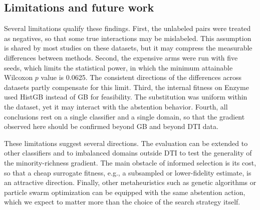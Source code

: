 \documentclass[pdflatex,sn-basic]{sn-jnl}
\begin{document}
\subsection{Limitations and future work}
Several limitations qualify these findings. First, the unlabeled pairs
were treated as negatives, so that some true interactions may be
mislabeled. This assumption is shared by most studies on these datasets,
but it may compress the measurable differences between methods. Second,
the expensive arms were run with five seeds, which limits the
statistical power, in which the minimum attainable Wilcoxon $p$ value is
0.0625. The consistent directions of the differences across datasets
partly compensate for this limit. Third, the internal fitness on Enzyme
used HistGB instead of GB for feasibility. The substitution was uniform
within the dataset, yet it may interact with the abstention behavior.
Fourth, all conclusions rest on a single classifier and a single domain,
so that the gradient observed here should be confirmed beyond GB and
beyond DTI data.

These limitations suggest several directions. The evaluation can be
extended to other classifiers and to imbalanced domains outside DTI to
test the generality of the minority-richness gradient. The main obstacle
of informed selection is its cost, so that a cheap surrogate fitness,
e.g., a subsampled or lower-fidelity estimate, is an attractive
direction. Finally, other metaheuristics such as genetic algorithms or
particle swarm optimization can be equipped with the same abstention
action, which we expect to matter more than the choice of the search
strategy itself.

\end{document}

